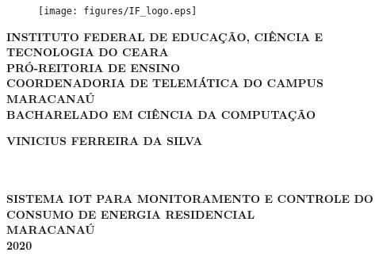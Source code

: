 \thispagestyle{empty}

\vfill
 \begin{center}
    \begin{figure}[t]
     \centering
            \texttt{[image: figures/IF\_logo.eps]}\\[-0.1in]
     \end{figure}

    {\large\bfseries INSTITUTO FEDERAL DE EDUCAÇÃO, CIÊNCIA E TECNOLOGIA DO CEARA} \\
    {\large\bfseries PRÓ-REITORIA DE ENSINO} \\
    {\large\bfseries COORDENADORIA DE TELEMÁTICA DO CAMPUS MARACANAÚ}  \\ 
    {\large\bfseries BACHARELADO EM CIÊNCIA DA COMPUTAÇÃO}  \\ 

    \vspace*{1in}
    \begin{large} \bfseries VINICIUS FERREIRA DA SILVA \end{large}\\[0.4in]

    \vspace*{4cm}
    \noindent \\
    \large\bfseries{SISTEMA IOT PARA MONITORAMENTO E CONTROLE DO CONSUMO DE ENERGIA RESIDENCIAL} \\
    \vfill
    \large\bfseries{ MARACANAÚ \\ 2020}
\end{center}

\normalsize